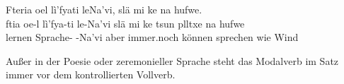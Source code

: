 \begin{interlin}
	\glll \Npawl{}Fteria oel lì'fyati leNa'vi, slä mi ke   na hufwe. \\
	ftia oe-l lì'fya-ti le-Na'vi slä mi ke tsun plltxe na hufwe \\
	lernen  Sprache- -Na'vi aber immer.noch  können sprechen wie Wind \\
\end{interlin}

\noindent Außer in der Poesie oder zeremonieller Sprache steht das Modalverb im Satz immer vor dem kontrollierten Vollverb.

